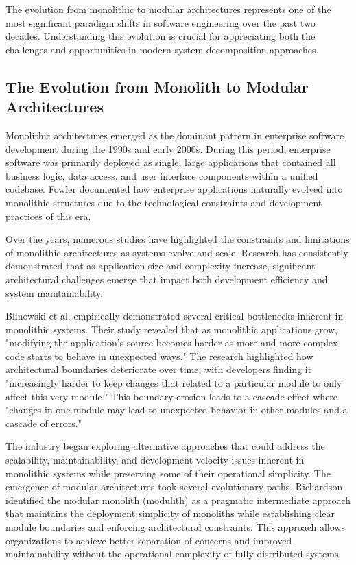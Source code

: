 The evolution from monolithic to modular architectures represents one of the most significant paradigm shifts in software engineering over the past two decades. Understanding this evolution is crucial for appreciating both the challenges and opportunities in modern system decomposition approaches.

\subsection{The Evolution from Monolith to Modular Architectures}
Monolithic architectures emerged as the dominant pattern in enterprise software development during the 1990s and early 2000s. During this period, enterprise software was primarily deployed as single, large applications that contained all business logic, data access, and user interface components within a unified codebase. Fowler \autocite{fowler2002patterns} documented how enterprise applications naturally evolved into monolithic structures due to the technological constraints and development practices of this era. 

Over the years, numerous studies have highlighted the constraints and limitations of monolithic architectures as systems evolve and scale. Research has consistently demonstrated that as application size and complexity increase, significant architectural challenges emerge that impact both development efficiency and system maintainability.

Blinowski et al. \autocite{Blinowski2022} empirically demonstrated several critical bottlenecks inherent in monolithic systems. Their study revealed that as monolithic applications grow, "modifying the application's source becomes harder as more and more complex code starts to behave in unexpected ways." The research highlighted how architectural boundaries deteriorate over time, with developers finding it "increasingly harder to keep changes that related to a particular module to only affect this very module." This boundary erosion leads to a cascade effect where "changes in one module may lead to unexpected behavior in other modules and a cascade of errors."

The industry began exploring alternative approaches that could address the scalability, maintainability, and development velocity issues inherent in monolithic systems while preserving some of their operational simplicity. The emergence of modular architectures took several evolutionary paths. Richardson \autocite{richardson2019microservices} identified the modular monolith (modulith) as a pragmatic intermediate approach that maintains the deployment simplicity of monoliths while establishing clear module boundaries and enforcing architectural constraints. This approach allows organizations to achieve better separation of concerns and improved maintainability without the operational complexity of fully distributed systems.


